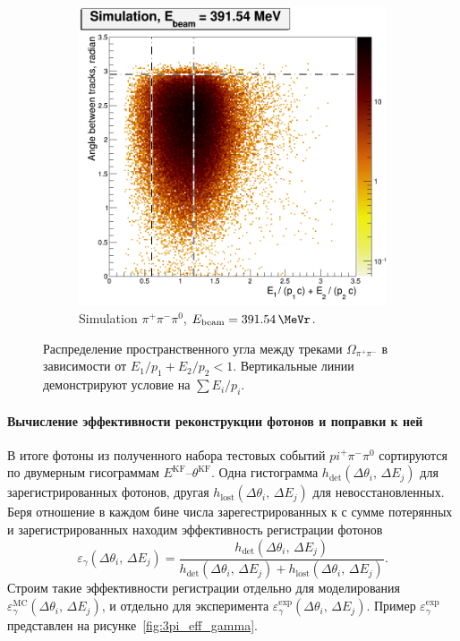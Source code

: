 \begin{figure}[htbp]
\begin{subfigure}[b]{0.45\textwidth}
        \includegraphics[width=\textwidth]{img/raskl_vs_sumEP_sim391_54.png}
        \caption{Simulation $\pi^+ \pi^- \pi^0$, $E_{\text{beam}} = \SI{391.54}{\MeVr}$.}
        \label{fig:3pi_raskl_sim391_54}
    \end{subfigure}
    \caption{Распределение пространственного угла между треками $\Omega_{\pi^+ \pi^-}$
    в зависимости от $E_1/p_1 + E_2 / p_2 < 1$.
    Вертикальные линии демонстрируют условие на $\sum E_i / p_i$.}\label{fig:3pi_raskl}
\end{figure}



\paragraph{Вычисление эффективности реконструкции фотонов и поправки к ней}

В итоге фотоны из полученного набора тестовых событий $pi^+ \pi^- \pi^0$
сортируются по двумерным гисограммам $E^{\text{KF}}$--$\theta^{\text{KF}}$.
Одна гистограмма $h_{\text{det}} ( \Delta \theta_i, \, \Delta E_j )$ для зарегистрированных фотонов,
другая $h_{\text{lost}} ( \Delta \theta_i, \, \Delta E_j )$ для невосстановленных.
Беря отношение в каждом бине числа зарегестрированных к с сумме потерянных и зарегистрированных
находим эффективность регистрации фотонов
\begin{equation}
	\varepsilon_{\gamma} ( \Delta \theta_i, \, \Delta E_j ) =
	\frac{h_{\text{det}} ( \Delta \theta_i, \, \Delta E_j )
	}{
	h_{\text{det}} ( \Delta \theta_i, \, \Delta E_j ) + h_{\text{lost}} ( \Delta \theta_i, \, \Delta E_j )
	} .
\end{equation}
Строим такие эффективности регистрации отдельно для моделирования
$\varepsilon_{\gamma}^{\text{MC}} ( \Delta \theta_i, \, \allowbreak \Delta E_j )$,
и отдельно для эксперимента
$\varepsilon_{\gamma}^{\text{exp}} ( \Delta \theta_i, \, \allowbreak \Delta E_j )$.
Пример $\varepsilon_{\gamma}^{\text{exp}}$ представлен на рисунке~\ref{fig:3pi_eff_gamma}.

